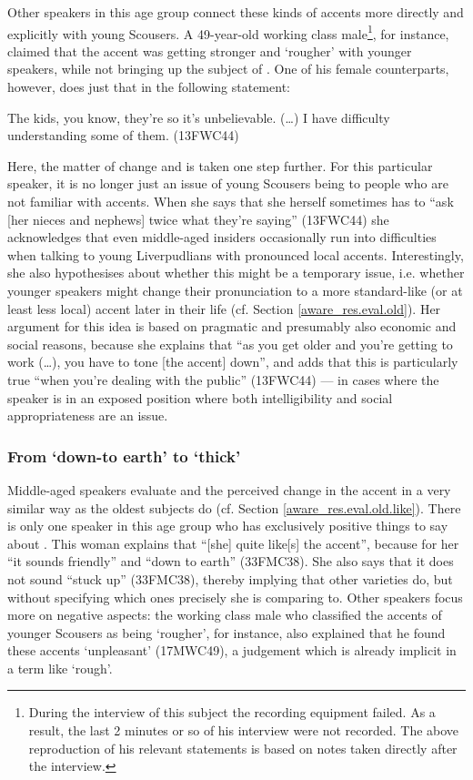 Other speakers in this age group connect these kinds of accents more directly and explicitly with young Scousers.
A 49-year-old working class male\footnote{During the interview of this subject the recording equipment failed. As a result, the last 2 minutes or so of his interview were not recorded. The above reproduction of his relevant statements is based on notes taken directly after the interview.}, for instance, claimed that the accent was getting stronger and `rougher' with younger speakers, while not bringing up the subject of .
One of his female counterparts, however, does just that in the following statement:
\begin{example}
	The kids, you know, they're so  it's unbelievable. (\ldots) I have difficulty understanding some of them. (13FWC44)
\end{example}
Here, the matter of change and  is taken one step further.
For this particular speaker, it is no longer just an issue of young Scousers being  to people who are not familiar with  accents.
When she says that she herself sometimes has to ``ask [her nieces and nephews] twice what they're saying'' (13FWC44) she acknowledges that even middle-aged insiders occasionally run into difficulties when talking to young Liverpudlians with pronounced local accents.
Interestingly, she also hypothesises about whether this might be a temporary issue, i.e. whether younger speakers might change their pronunciation to a more standard-like (or at least less local) accent later in their life (cf. Section \ref{aware_res.eval.old}).
Her argument for this idea is based on pragmatic and presumably also economic and social reasons, because she explains that ``as you get older and you're getting to work (\ldots), you have to tone [the accent] down'', and adds that this is particularly true ``when you're dealing with the public'' (13FWC44) --- in cases where the speaker is in an exposed position where both intelligibility and social appropriateness are an issue.

\subsubsection{From `down-to earth' to `thick'}
\label{aware_res.eval.mid.like}

Middle-aged speakers evaluate  and the perceived change in the accent in a very similar way as the oldest subjects do (cf. Section \ref{aware_res.eval.old.like}).
There is only one speaker in this age group who has exclusively positive things to say about .
This woman explains that ``[she] quite like[s] the accent'', because for her ``it sounds friendly'' and ``down to earth'' (33FMC38).
She also says that it does not sound ``stuck up'' (33FMC38), thereby implying that other varieties do, but without specifying which ones precisely she is comparing  to.
Other speakers focus more on negative aspects: the working class male who classified the accents of younger Scousers as being `rougher', for instance, also explained that he found these accents `unpleasant' (17MWC49), a judgement which is already implicit in a term like `rough'.

